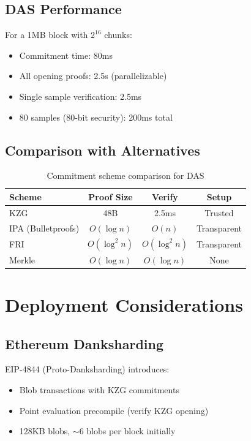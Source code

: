 \documentclass[11pt,a4paper]{article}
\begin{document}
\subsection{DAS Performance}

For a 1MB block with $2^{16}$ chunks:
\begin{itemize}
    \item Commitment time: 80ms
    \item All opening proofs: 2.5s (parallelizable)
    \item Single sample verification: 2.5ms
    \item 80 samples (80-bit security): 200ms total
\end{itemize}

\subsection{Comparison with Alternatives}

\begin{table}[h]
\centering
\begin{tabular}{lccc}
\toprule
\textbf{Scheme} & \textbf{Proof Size} & \textbf{Verify} & \textbf{Setup} \\
\midrule
KZG & 48B & 2.5ms & Trusted \\
IPA (Bulletproofs) & $O(\log n)$ & $O(n)$ & Transparent \\
FRI & $O(\log^2 n)$ & $O(\log^2 n)$ & Transparent \\
Merkle & $O(\log n)$ & $O(\log n)$ & None \\
\bottomrule
\end{tabular}
\caption{Commitment scheme comparison for DAS}
\label{tab:das-compare}
\end{table}

\section{Deployment Considerations}

\subsection{Ethereum Danksharding}

EIP-4844 (Proto-Danksharding) introduces:
\begin{itemize}
    \item Blob transactions with KZG commitments
    \item Point evaluation precompile (verify KZG opening)
    \item 128KB blobs, $\sim$6 blobs per block initially
\end{itemize}
\end{document}
